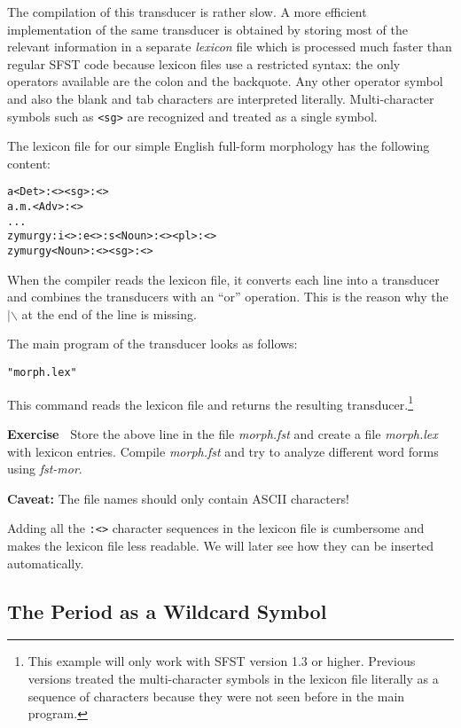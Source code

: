 \documentclass[11pt]{article}
\newenvironment{exercise}{

  \hrulefill\nopagebreak

  \textbf{Exercise~}}
{

  \nopagebreak\hrulefill\vspace{0.2cm}

}
\begin{document}
The compilation of this transducer is rather slow. A more efficient
implementation of the same transducer is obtained by storing most of
the relevant information in a separate \emph{lexicon} file which is
processed much faster than regular SFST code because lexicon files use
a restricted syntax: the only operators available are the colon and
the backquote. Any other operator symbol and also the blank and tab
characters are interpreted literally. Multi-character symbols such as
\verb#<sg># are recognized and treated as a single symbol.

The lexicon file for our simple English full-form morphology has the
following content:

\begin{verbatim}
a<Det>:<><sg>:<>
a.m.<Adv>:<>
...
zymurgy:i<>:e<>:s<Noun>:<><pl>:<>
zymurgy<Noun>:<><sg>:<>
\end{verbatim}

When the compiler reads the lexicon file, it converts each line into a
transducer and combines the transducers with an ``or'' operation. This
is the reason why the $|\backslash$ at the end of the line is missing.

The main program of the transducer looks as follows:

\begin{verbatim}
"morph.lex"
\end{verbatim}

This command reads the lexicon file and returns the resulting
transducer.\footnote{This example will only work with SFST version 1.3
  or higher. Previous versions treated the multi-character symbols in
  the lexicon file literally as a sequence of characters because they
  were not seen before in the main program.}
\begin{exercise}
  Store the above line in the file \emph{morph.fst} and create a file
  \emph{morph.lex} with lexicon entries. Compile \emph{morph.fst} and
  try to analyze different word forms using \emph{fst-mor}.
\end{exercise}

\textbf{Caveat:} The file names should only contain ASCII characters!

Adding all the \verb#:<># character sequences in the lexicon file is
cumbersome and makes the lexicon file less readable. We will later
see how they can be inserted automatically.


\subsection{The Period as a Wildcard Symbol}
\end{document}
